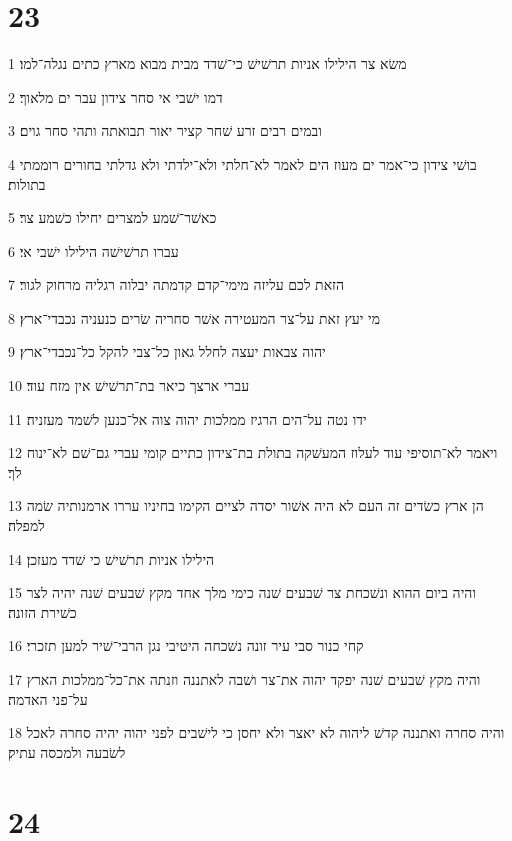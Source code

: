 \chapter{23}

\par 1 משׂא צר הילילו אניות תרשׁישׁ כי־שׁדד מבית מבוא מארץ כתים נגלה־למו׃
\par 2 דמו ישׁבי אי סחר צידון עבר ים מלאוך׃
\par 3 ובמים רבים זרע שׁחר קציר יאור תבואתה ותהי סחר גוים׃
\par 4 בושׁי צידון כי־אמר ים מעוז הים לאמר לא־חלתי ולא־ילדתי ולא גדלתי בחורים רוממתי בתולות׃
\par 5 כאשׁר־שׁמע למצרים יחילו כשׁמע צר׃
\par 6 עברו תרשׁישׁה הילילו ישׁבי אי׃
\par 7 הזאת לכם עליזה מימי־קדם קדמתה יבלוה רגליה מרחוק לגור׃
\par 8 מי יעץ זאת על־צר המעטירה אשׁר סחריה שׂרים כנעניה נכבדי־ארץ׃
\par 9 יהוה צבאות יעצה לחלל גאון כל־צבי להקל כל־נכבדי־ארץ׃
\par 10 עברי ארצך כיאר בת־תרשׁישׁ אין מזח עוד׃
\par 11 ידו נטה על־הים הרגיז ממלכות יהוה צוה אל־כנען לשׁמד מעזניה׃
\par 12 ויאמר לא־תוסיפי עוד לעלוז המעשׁקה בתולת בת־צידון כתיים קומי עברי גם־שׁם לא־ינוח לך׃
\par 13 הן ארץ כשׂדים זה העם לא היה אשׁור יסדה לציים הקימו בחיניו עררו ארמנותיה שׂמה למפלה׃
\par 14 הילילו אניות תרשׁישׁ כי שׁדד מעזכן׃
\par 15 והיה ביום ההוא ונשׁכחת צר שׁבעים שׁנה כימי מלך אחד מקץ שׁבעים שׁנה יהיה לצר כשׁירת הזונה׃
\par 16 קחי כנור סבי עיר זונה נשׁכחה היטיבי נגן הרבי־שׁיר למען תזכרי׃
\par 17 והיה מקץ שׁבעים שׁנה יפקד יהוה את־צר ושׁבה לאתננה וזנתה את־כל־ממלכות הארץ על־פני האדמה׃
\par 18 והיה סחרה ואתננה קדשׁ ליהוה לא יאצר ולא יחסן כי לישׁבים לפני יהוה יהיה סחרה לאכל לשׂבעה ולמכסה עתיק׃

\chapter{24}


